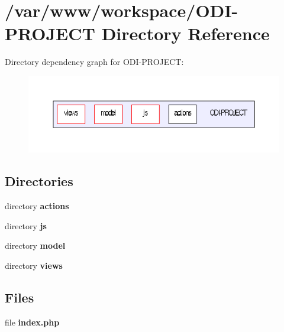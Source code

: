 \section{/var/www/workspace/\+O\+D\+I-\/\+P\+R\+O\+J\+E\+C\+T Directory Reference}
\label{dir_7aa60ddf9f11ef497cb94c04d25e7649}
Directory dependency graph for O\+D\+I-\/\+P\+R\+O\+J\+E\+C\+T\+:\nopagebreak
\begin{figure}[H]
\begin{center}
\leavevmode
\includegraphics[width=350pt]{dir_7aa60ddf9f11ef497cb94c04d25e7649_dep}
\end{center}
\end{figure}
\subsection*{Directories}
\begin{DoxyCompactItemize}
\item 
directory {\bf actions}
\item 
directory {\bf js}
\item 
directory {\bf model}
\item 
directory {\bf views}
\end{DoxyCompactItemize}
\subsection*{Files}
\begin{DoxyCompactItemize}
\item 
file {\bfseries index.\+php}
\end{DoxyCompactItemize}
